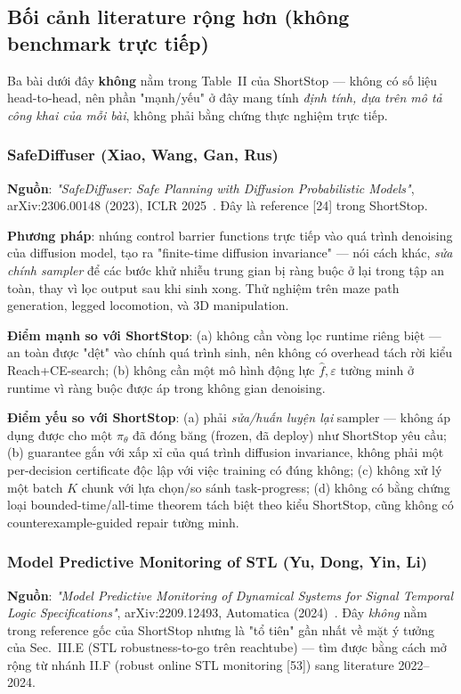 \documentclass[a4paper,12pt]{article}
\begin{document}
\subsection{Bối cảnh literature rộng hơn (không benchmark trực tiếp)}\label{sec:related-context}
Ba bài dưới đây \textbf{không} nằm trong Table~II của ShortStop --- không có số liệu head-to-head, nên phần "mạnh/yếu" ở đây mang tính \emph{định tính, dựa trên mô tả công khai của mỗi bài}, không phải bằng chứng thực nghiệm trực tiếp.

\subsubsection{SafeDiffuser (Xiao, Wang, Gan, Rus)}
\textbf{Nguồn}: \emph{"SafeDiffuser: Safe Planning with Diffusion Probabilistic Models"}, arXiv:2306.00148 (2023), ICLR 2025~\cite{xiao2023safediffuser}. Đây là reference [24] trong ShortStop.

\textbf{Phương pháp}: nhúng control barrier functions trực tiếp vào quá trình denoising của diffusion model, tạo ra "finite-time diffusion invariance" --- nói cách khác, \emph{sửa chính sampler} để các bước khử nhiễu trung gian bị ràng buộc ở lại trong tập an toàn, thay vì lọc output sau khi sinh xong. Thử nghiệm trên maze path generation, legged locomotion, và 3D manipulation.

\textbf{Điểm mạnh so với ShortStop}: (a) không cần vòng lọc runtime riêng biệt --- an toàn được "dệt" vào chính quá trình sinh, nên không có overhead tách rời kiểu Reach+CE-search; (b) không cần một mô hình động lực $\hat f,\varepsilon$ tường minh ở runtime vì ràng buộc được áp trong không gian denoising.

\textbf{Điểm yếu so với ShortStop}: (a) phải \emph{sửa/huấn luyện lại} sampler --- không áp dụng được cho một $\pi_\theta$ đã đóng băng (frozen, đã deploy) như ShortStop yêu cầu; (b) guarantee gắn với xấp xỉ của quá trình diffusion invariance, không phải một per-decision certificate độc lập với việc training có đúng không; (c) không xử lý một batch $K$ chunk với lựa chọn/so sánh task-progress; (d) không có bằng chứng loại bounded-time/all-time theorem tách biệt theo kiểu ShortStop, cũng không có counterexample-guided repair tường minh.

\subsubsection{Model Predictive Monitoring of STL (Yu, Dong, Yin, Li)}
\textbf{Nguồn}: \emph{"Model Predictive Monitoring of Dynamical Systems for Signal Temporal Logic Specifications"}, arXiv:2209.12493, Automatica (2024)~\cite{yu2024modelpredictive}. Đây \emph{không} nằm trong reference gốc của ShortStop nhưng là "tổ tiên" gần nhất về mặt ý tưởng của Sec.~III.E (STL robustness-to-go trên reachtube) — tìm được bằng cách mở rộng từ nhánh II.F (robust online STL monitoring [53]) sang literature 2022--2024.
\end{document}
